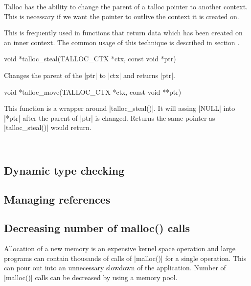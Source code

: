Talloc has the ability to change the parent of a talloc pointer to another
context. This is necessary if we want the pointer to outlive the context it is
created on.

This is frequently used in functions that return data which has been created on
an inner context. The common usage of this technique is described in section
.

\begin{funcproto}
void *talloc_steal(TALLOC_CTX *ctx, const void *ptr)
\end{funcproto}
\begin{funcdesc}
  Changes the parent of the |ptr| to |ctx| and returns |ptr|.
\end{funcdesc}
\begin{funcproto}
void *talloc_move(TALLOC_CTX *ctx, const void **ptr)
\end{funcproto}
\begin{funcdesc}
  This function is a wrapper around |talloc_steal()|. It will assing |NULL| into
  |*ptr| after the parent of |ptr| is changed. Returns the same pointer as
  |talloc_steal()| would return.
\end{funcdesc}
\
\subsection{Dynamic type checking}
\label{talloc:subsec:type-checking}


\subsection{Managing references}
\label{talloc:subsec:references}

\subsection{Decreasing number of malloc() calls}
\label{talloc:subsec:pool}


Allocation of a new memory is an expensive kernel space operation and large
programs can contain thousands of calls of |malloc()| for a single operation.
This can pour out into an unnecessary slowdown of the application. Number of
|malloc()| calls can be decreased by using a memory pool.

